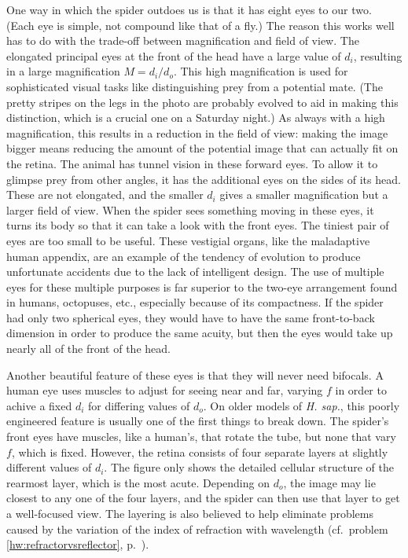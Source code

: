 One way in which the spider outdoes us is that it has eight eyes to our two. (Each eye is simple, not compound like that of a fly.)
The reason this works well has to do with the trade-off between magnification and field of view. The elongated principal eyes at the
front of the head have a large value of $d_i$, resulting in a large magnification $M=d_i/d_o$. This high magnification is used for
sophisticated visual tasks like distinguishing prey from a potential mate. (The pretty stripes on the legs in the photo are probably
evolved to aid in making this distinction, which is a crucial one on a Saturday night.) As always with a high magnification, this results
in a reduction in the field of view: making the image bigger means reducing the amount of the potential image that can
actually fit on the retina. The animal has tunnel vision in these forward eyes. To allow it to glimpse prey from other angles, it has
the additional eyes on the sides of its head. These are not elongated, and the smaller $d_i$ gives a smaller magnification but
a larger field of view. When the spider sees something moving in these eyes, it turns its body so that it can take a look with
the front eyes. The tiniest pair of eyes are too small to be useful. These vestigial organs, like the maladaptive human appendix,
are an example of the tendency of evolution to produce unfortunate accidents due to the lack of intelligent design. The use of multiple
eyes for these multiple purposes is far superior to the two-eye arrangement found in humans, octopuses, etc., especially because of its
compactness. If the spider had only two spherical eyes, they would have to have the same front-to-back dimension in order to produce
the same acuity, but then the eyes would take up nearly all of the front of the head.

Another beautiful feature of these eyes is that they will never need bifocals. A human eye uses muscles to adjust for
seeing near and far, varying $f$ in order to achive a fixed $d_i$ for differing values of $d_o$. On older models of
\emph{H. sap.}, this poorly engineered feature is usually one of the first things to break down. The spider's front eyes have
muscles, like a human's, that rotate the tube, but none that vary $f$, which is fixed. However, the retina consists of four
separate layers at slightly different values of $d_i$. The figure only shows the detailed cellular structure of the rearmost
layer, which is the most acute. Depending on $d_o$, the image may lie closest to any one of the four layers, and the spider can then
use that layer to get a well-focused view. The layering is also believed to help eliminate problems caused by the variation of the
index of refraction with wavelength (cf.~problem \ref{hw:refractorvsreflector}, p.~\pageref{hw:refractorvsreflector}).

